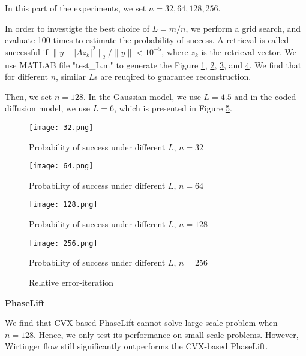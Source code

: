 \documentclass[conference,onecolumn,12pt]{IEEEtran}
\newcommand{\<}{\langle}
\renewcommand{\>}{\rangle}
\numberwithin{equation}{section}
\begin{document}
In this part of the experiments, we set $n=32, 64, 128, 256$. 

In order to investigte the best choice of $L = m/n$, we perform a grid search, and evaluate 100 times to estimate the probability of success. A retrieval is called successful if $\|y-|Az_k|^2\|_2/\|y\| < 10^{-5}$, where $z_k$ is the retrieval vector. We use MATLAB file "test\_L.m" to generate the Figure \ref{fig: L32}, \ref{fig: L64}, \ref{fig: L128}, and \ref{fig: L256}. We find that for different $n$, similar $L$s are reuqired to guarantee reconstruction.

Then, we set $n=128$. In the Gaussian model, we use $L=4.5$ and in the coded diffusion model, we use $L=6$, which is presented in Figure \ref{fig: err}.


\begin{figure}[htbp]
  \centering
  \texttt{[image: 32.png]}
  \caption{Probability of success under different $L$, $n=32$}
  \label{fig: L32}
\end{figure}

\begin{figure}[htbp]
    \centering
    \texttt{[image: 64.png]}
    \caption{Probability of success under different $L$, $n=64$}
    \label{fig: L64}
\end{figure}

\begin{figure}[htbp]
  \centering
  \texttt{[image: 128.png]}
  \caption{Probability of success under different $L$, $n=128$}
  \label{fig: L128}
\end{figure}

\begin{figure}[htbp]
  \centering
  \texttt{[image: 256.png]}
  \caption{Probability of success under different $L$, $n=256$}
  \label{fig: L256}
\end{figure}

\begin{figure}[htbp]
    \centering
    \caption{Relative error-iteration}
    \label{fig: err}
\end{figure}


{\bf PhaseLift}

We find that CVX-based PhaseLift cannot solve large-scale problem when $n=128$. Hence, we only test its performance on small scale problems. However, Wirtinger flow still significantly outperforms the CVX-based PhaseLift. 
\end{document}
